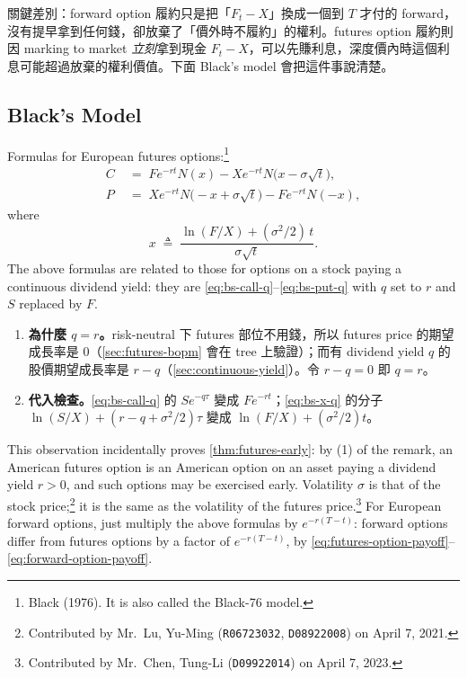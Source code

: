 \begin{remark}
	關鍵差別：forward option 履約只是把「$F_{t}-X$」換成一個到 $T$ 才付的 forward，沒有提早拿到任何錢，卻放棄了「價外時不履約」的權利。futures option 履約則因 marking to market \emph{立刻}拿到現金 $F_{t}-X$，可以先賺利息，深度價內時這個利息可能超過放棄的權利價值。下面 Black's model 會把這件事說清楚。
\end{remark}
\suppend

\subsection{Black's Model}
\label{sec:black-model}


Formulas for European futures options:\footnote{Black (1976). It is also called the Black-76 model.}
\begin{align}
	C & \;=\; Fe^{-rt}N(x)-Xe^{-rt}N\bigl(x-\sigma\sqrt{t}\bigr) , \label{eq:black-call} \\
	P & \;=\; Xe^{-rt}N\bigl(-x+\sigma\sqrt{t}\bigr)-Fe^{-rt}N(-x) , \label{eq:black-put}
\end{align}
where
\[
	x \;\triangleq\; \frac{\ln(F/X)+(\sigma^{2}/2)\,t}{\sigma\sqrt{t}} .
\]
The above formulas are related to those for options on a stock paying a continuous dividend yield: they are \eqref{eq:bs-call-q}--\eqref{eq:bs-put-q} with $q$ set to $r$ and $S$ replaced by $F$.

\suppstart
{}

\begin{remark}
	\begin{enumerate}[(1),nosep]
		\item \textbf{為什麼 $q=r$。}risk-neutral 下 futures 部位不用錢，所以 futures price 的期望成長率是 $0$（\autoref{sec:futures-bopm} 會在 tree 上驗證）；而有 dividend yield $q$ 的股價期望成長率是 $r-q$（\autoref{sec:continuous-yield}）。令 $r-q=0$ 即 $q=r$。
		\item \textbf{代入檢查。}\eqref{eq:bs-call-q} 的 $Se^{-q\tau}$ 變成 $Fe^{-rt}$；\eqref{eq:bs-x-q} 的分子 $\ln(S/X)+(r-q+\sigma^{2}/2)\tau$ 變成 $\ln(F/X)+(\sigma^{2}/2)t$。
	\end{enumerate}
\end{remark}
\suppend

This observation incidentally proves \autoref{thm:futures-early}: by (1) of the remark, an American futures option is an American option on an asset paying a dividend yield $r>0$, and such options may be exercised early.
Volatility $\sigma$ is that of the stock price;\footnote{Contributed by Mr.~Lu, Yu-Ming (\texttt{R06723032}, \texttt{D08922008}) on April 7, 2021.} it is the same as the volatility of the futures price.\footnote{Contributed by Mr.~Chen, Tung-Li (\texttt{D09922014}) on April 7, 2023.}
For European forward options, just multiply the above formulas by $e^{-r(T-t)}$: forward options differ from futures options by a factor of $e^{-r(T-t)}$, by \eqref{eq:futures-option-payoff}--\eqref{eq:forward-option-payoff}.

